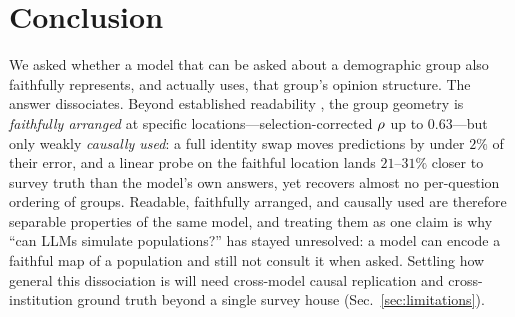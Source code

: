 \section{Conclusion}
\label{sec:conclusion}

We asked whether a model that can be asked about a demographic group also
faithfully represents, and actually uses, that group's opinion structure.
The answer dissociates. Beyond established readability
\citep{llmopinions2026}, the group geometry is \emph{faithfully arranged}
at specific locations---selection-corrected $\rho$ up to $0.63$---but
only weakly \emph{causally used}: a full identity swap moves predictions
by under $2\%$ of their error, and a linear probe on the faithful
location lands $21$--$31\%$ closer to survey truth than the model's own
answers, yet recovers almost no per-question ordering of groups. Readable,
faithfully arranged, and causally used are therefore separable properties
of the same model, and treating them as one claim is why ``can LLMs
simulate populations?'' has stayed unresolved: a model can encode a
faithful map of a population and still not consult it when asked. Settling
how general this dissociation is will need cross-model causal replication
and cross-institution ground truth beyond a single survey house
(Sec.~\ref{sec:limitations}).
